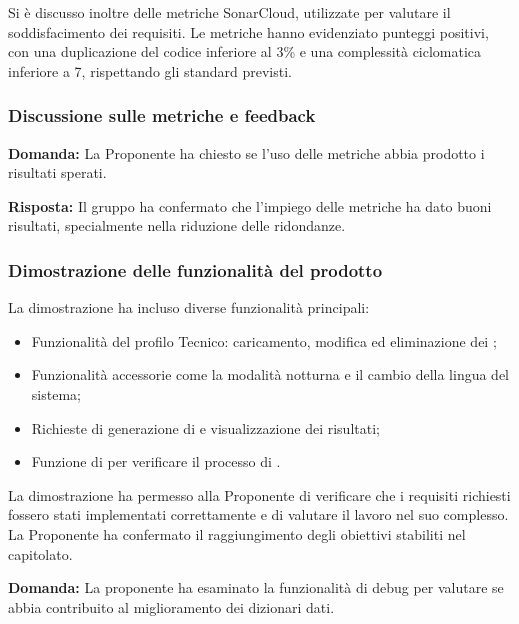 \par Si è discusso inoltre delle metriche SonarCloud, utilizzate per valutare il soddisfacimento dei requisiti. Le metriche hanno evidenziato punteggi positivi, con una duplicazione del codice inferiore al 3\% e una complessità ciclomatica inferiore a 7, rispettando gli standard previsti.

\subsubsection{Discussione sulle metriche e feedback}

\par \textbf{Domanda:} La Proponente ha chiesto se l'uso delle metriche abbia prodotto i risultati sperati.

\par \textbf{Risposta:} Il gruppo ha confermato che l'impiego delle metriche ha dato buoni risultati, specialmente nella riduzione delle ridondanze.

\subsubsection{Dimostrazione delle funzionalità del prodotto}

\par La dimostrazione ha incluso diverse funzionalità principali:
\begin{itemize}
    \item Funzionalità del profilo Tecnico: caricamento, modifica ed eliminazione dei ;
    \item Funzionalità accessorie come la modalità notturna e il cambio della lingua del sistema;
    \item Richieste di generazione di  e visualizzazione dei risultati; 
    \item Funzione di  per verificare il processo di .
\end{itemize}

\par La dimostrazione ha permesso alla Proponente di verificare che i requisiti richiesti fossero stati implementati correttamente e di valutare il lavoro nel suo complesso. La Proponente ha confermato il raggiungimento degli obiettivi stabiliti nel capitolato. 

\par \textbf{Domanda:} La proponente ha esaminato la funzionalità di debug per valutare se abbia contribuito al miglioramento dei dizionari dati.

